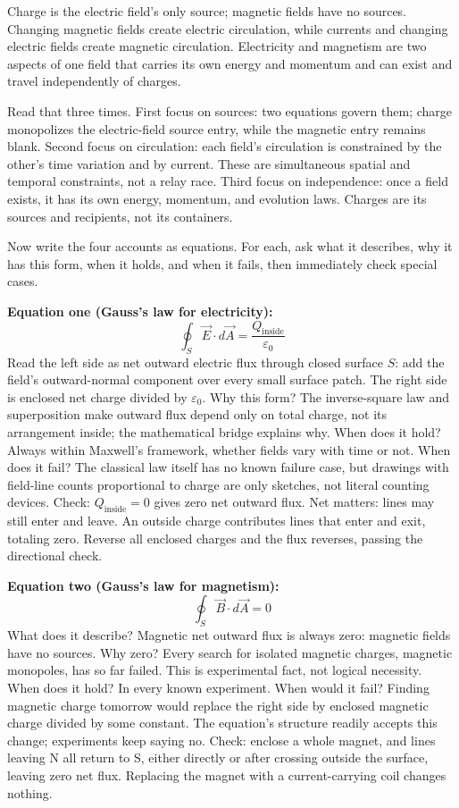 \begin{oneline}
Charge is the electric field's only source; magnetic fields have no sources. Changing magnetic fields create electric circulation, while currents and changing electric fields create magnetic circulation. Electricity and magnetism are two aspects of one field that carries its own energy and momentum and can exist and travel independently of charges.
\end{oneline}

Read that three times. First focus on sources: two equations govern them; charge monopolizes the electric-field source entry, while the magnetic entry remains blank. Second focus on circulation: each field's circulation is constrained by the other's time variation and by current. These are simultaneous spatial and temporal constraints, not a relay race. Third focus on independence: once a field exists, it has its own energy, momentum, and evolution laws. Charges are its sources and recipients, not its containers.


Now write the four accounts as equations. For each, ask what it describes, why it has this form, when it holds, and when it fails, then immediately check special cases.

\textbf{Equation one (Gauss's law for electricity):}
\[
\oint_S \vec E\cdot d\vec A=\frac{Q_{\text{inside}}}{\varepsilon_0}
\]
Read the left side as net outward electric flux through closed surface \(S\): add the field's outward-normal component over every small surface patch. The right side is enclosed net charge divided by \(\varepsilon_0\). Why this form? The inverse-square law and superposition make outward flux depend only on total charge, not its arrangement inside; the mathematical bridge explains why. When does it hold? Always within Maxwell's framework, whether fields vary with time or not. When does it fail? The classical law itself has no known failure case, but drawings with field-line counts proportional to charge are only sketches, not literal counting devices. Check: \(Q_{\text{inside}}=0\) gives zero net outward flux. Net matters: lines may still enter and leave. An outside charge contributes lines that enter and exit, totaling zero. Reverse all enclosed charges and the flux reverses, passing the directional check.

\textbf{Equation two (Gauss's law for magnetism):}
\[
\oint_S \vec B\cdot d\vec A=0
\]
What does it describe? Magnetic net outward flux is always zero: magnetic fields have no sources. Why zero? Every search for isolated magnetic charges, magnetic monopoles, has so far failed. This is experimental fact, not logical necessity. When does it hold? In every known experiment. When would it fail? Finding magnetic charge tomorrow would replace the right side by enclosed magnetic charge divided by some constant. The equation's structure readily accepts this change; experiments keep saying no. Check: enclose a whole magnet, and lines leaving N all return to S, either directly or after crossing outside the surface, leaving zero net flux. Replacing the magnet with a current-carrying coil changes nothing.

